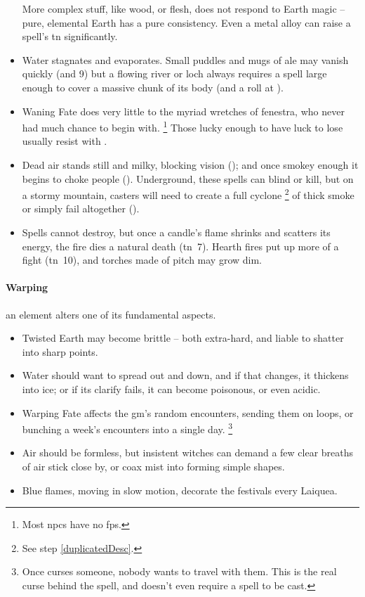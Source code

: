 \begin{multicols}{2}
\begin{itemize}
  More complex stuff, like wood, or flesh, does not respond to Earth magic -- pure, elemental Earth has a pure consistency.
  Even a metal alloy can raise a spell's \gls{tn} significantly.
  \item
  Water stagnates and evaporates.
  Small puddles and mugs of ale may vanish quickly (\tn[6] and 9)
  but a flowing river or loch always requires a spell large enough to cover a massive chunk of its body (and a roll at \tn[12]).
  \item
  Waning Fate does very little to the myriad wretches of \gls{fenestra}, who never had much chance to begin with.%
  \footnote{Most \glspl{npc} have no \glspl{fp}.}
  Those lucky enough to have luck to lose usually resist with .
  \item
  Dead air stands still and milky, blocking vision (\tn[7]);
  and once smokey enough it begins to choke people (\tn[9]).
  Underground, these spells can blind or kill, but on a stormy mountain, casters will need to create a full cyclone%
  \footnote{See step \vref{duplicatedDesc}.}
  of thick smoke or simply fail altogether (\tn[16]).
  \item
  Spells cannot destroy, but once a candle's flame shrinks and scatters its energy, the fire dies a natural death (\gls{tn}~7).
  Hearth fires put up more of a fight (\gls{tn}~10), and torches made of pitch may grow dim.
\end{itemize}

\paragraph{Warping}
an element alters one of its fundamental aspects.

\begin{itemize}
  \item
  Twisted Earth may become brittle -- both extra-hard, and liable to shatter into sharp points.
  \item
  Water should want to spread out and down, and if that changes, it thickens into ice;
  or if its clarify fails, it can become poisonous, or even acidic.
  \item
  Warping Fate affects the \gls{gm}'s random encounters, sending them on loops, or bunching a week's encounters into a single day.%
  \footnote{Once  curses someone, nobody wants to travel with them.  This is the real curse behind the spell, and doesn't even require a spell to be cast.}
  \item
  Air should be formless, but insistent witches can demand a few clear breaths of air stick close by, or coax mist into forming simple shapes.
  \item
  Blue flames, moving in slow motion, decorate the festivals every \gls{Laiquea}.
\end{itemize}


\end{multicols}
